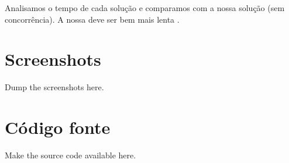 \documentclass[conference]{IEEEtran}
\begin{document}
Analisamos o tempo de cada solução e comparamos com a nossa solução (sem concorrência). A nossa deve ser bem mais lenta .

\section{Screenshots}

Dump the screenshots here.

\section{Código fonte}

Make the source code available here.


\end{document}
